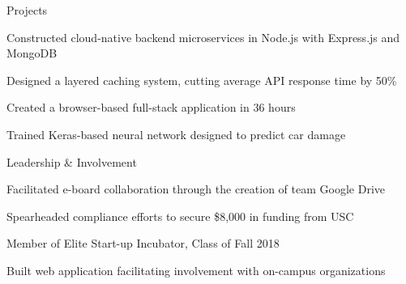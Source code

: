 \documentclass{resume} %
\begin{document}

\begin{rSection}{Projects}

\begin{rList}
\item Constructed cloud-native backend microservices in Node.js with Express.js
    and MongoDB
\item Designed a layered caching system, cutting average API response time by
    50\%
\end{rList}
\vspace{0.5em}


\begin{rList}
\item Created a browser-based full-stack application in 36 hours
\item Trained Keras-based neural network designed to predict car damage
\end{rList}

\end{rSection}


\begin{rSection}{Leadership \& Involvement}

\company{\uscih}{\la}
\begin{rList}
\item Facilitated e-board collaboration through the creation of team Google Drive
\item Spearheaded compliance efforts to secure \$8,000 in funding from USC
\end{rList}
\vspace{0.5em}


\company{\lavalab}{\la}
\begin{rList}
\item Member of Elite Start-up Incubator, Class of Fall 2018
\item Built web application facilitating involvement with on-campus 
    organizations
\end{rList}

\end{rSection}

\end{document}

